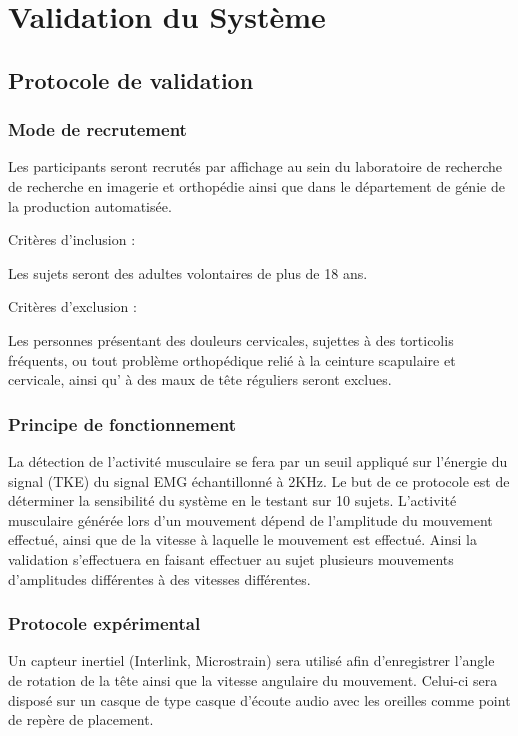 \documentclass[letterpaper, twoside, 12pt, memoire, creativecommons, hyperref]{thETS}
\begin{document}
\section{Validation du Système}

\subsection{Protocole de validation}

\subsubsection{Mode de recrutement} 

Les participants seront recrutés par affichage au sein du laboratoire de recherche de recherche en imagerie et orthopédie ainsi que dans le département de génie de la production automatisée.

Critères d’inclusion :
 
Les sujets seront des adultes volontaires de plus de 18 ans.

Critères d’exclusion :

Les personnes présentant des douleurs cervicales, sujettes à des torticolis fréquents, ou tout problème orthopédique relié à la ceinture scapulaire et cervicale, ainsi qu’ à des maux de tête réguliers seront exclues.

\subsubsection{Principe de fonctionnement}

La détection de l’activité musculaire se fera par un seuil appliqué sur l’énergie du signal  (TKE) du signal EMG échantillonné à 2KHz. Le but de ce protocole est de déterminer la sensibilité du système en le testant sur 10 sujets. L’activité musculaire générée lors d’un mouvement dépend de l’amplitude du mouvement effectué, ainsi que de la vitesse à laquelle le mouvement est effectué. Ainsi la validation s’effectuera en faisant effectuer au sujet plusieurs mouvements d’amplitudes différentes à des vitesses différentes. 

\subsubsection{Protocole expérimental}

Un capteur inertiel (Interlink, Microstrain) sera utilisé afin d’enregistrer l’angle de rotation de la tête ainsi que la vitesse angulaire du mouvement. Celui-ci sera disposé sur un casque de type casque d’écoute audio avec les oreilles comme point de repère de placement. 
\end{document}
